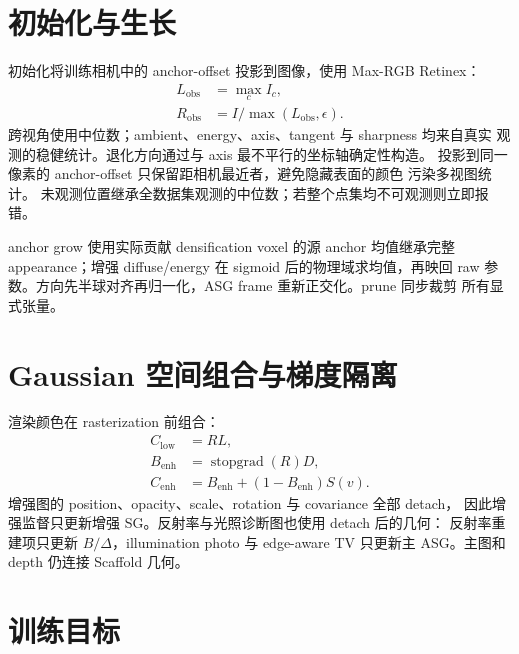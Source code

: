 \documentclass[UTF8]{ctexart}
\begin{document}
\section{初始化与生长}

初始化将训练相机中的 anchor-offset 投影到图像，使用 Max-RGB Retinex：
\begin{align}
  L_{\mathrm{obs}} &= \max_c I_c,\\
  R_{\mathrm{obs}} &= I/\max(L_{\mathrm{obs}},\epsilon).
\end{align}
跨视角使用中位数；ambient、energy、axis、tangent 与 sharpness 均来自真实
观测的稳健统计。退化方向通过与 axis 最不平行的坐标轴确定性构造。
投影到同一像素的 anchor-offset 只保留距相机最近者，避免隐藏表面的颜色
污染多视图统计。
未观测位置继承全数据集观测的中位数；若整个点集均不可观测则立即报错。

anchor grow 使用实际贡献 densification voxel 的源 anchor 均值继承完整
appearance；增强 diffuse/energy 在 sigmoid 后的物理域求均值，再映回 raw
参数。方向先半球对齐再归一化，ASG frame 重新正交化。prune 同步裁剪
所有显式张量。

\section{Gaussian 空间组合与梯度隔离}

渲染颜色在 rasterization 前组合：
\begin{align}
  C_{\mathrm{low}} &= R L,\\
  B_{\mathrm{enh}} &= \operatorname{stopgrad}(R)D,\\
  C_{\mathrm{enh}} &=B_{\mathrm{enh}}+(1-B_{\mathrm{enh}})S(v).
\end{align}
增强图的 position、opacity、scale、rotation 与 covariance 全部 detach，
因此增强监督只更新增强 SG。反射率与光照诊断图也使用 detach 后的几何：
反射率重建项只更新 $B/\Delta$，illumination photo 与 edge-aware TV 只更新主 ASG。主图和 depth
仍连接 Scaffold 几何。

\section{训练目标}
\end{document}
